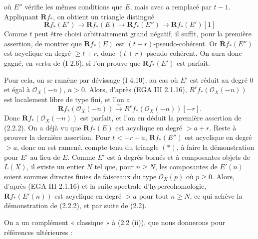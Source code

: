 où \(E''\) vérifie les
mêmes conditions que \(E\), mais avec \(a\) remplacé par \(t-1\). Appliquant \(\mathbf Rf_*\), on obtient un triangle distingué
\begin{equation}\tag{$*$}
\mathbf Rf_*(E')\longrightarrow \mathbf Rf_*(E)\longrightarrow \mathbf Rf_*(E'')\longrightarrow \mathbf Rf_*(E')[1]
\end{equation}
Comme \(t\) peut être choisi arbitrairement grand négatif, il suffit, pour la première assertion, de montrer que \(\mathbf Rf_*(E)\) est \((t+r)\)-pseudo-cohérent. Or \(\mathbf Rf_*(E'')\) est acyclique en degré \(\geq t+r\), donc \((t+r)\)-pseudo-cohérent. On aura donc gagné, en vertu de (I 2.6), si l'on prouve que \(\mathbf Rf_*(E')\) est parfait.

Pour cela, on se ramène par dévissage (I 4.10), au cas où \(E'\) est réduit au degré \(0\) et égal à \(\mathcal O_X(-n)\), \(n>0\). Alors, d'après (EGA III 2.1.16), \(R^rf_*(\mathcal O_X(-n))\) est localement libre de type fini, et l'on a
\[
  \mathbf Rf_*(\mathcal O_X(-n))\xrightarrow{\sim} R^rf_*(\mathcal O_X(-n))[-r].
\]
Donc \(\mathbf Rf_*(\mathcal O_X(-n))\) est parfait, et l'on en déduit la première assertion de (2.2.2). On a déjà vu que \(\mathbf Rf_*(E)\) est acyclique en degré \(>a+r\). Reste à prouver la dernière assertion. Pour \(t<-r+a\), \(\mathbf Rf_*(E'')\) est acyclique en degré \(>a\), donc on est ramené, compte tenu du triangle \((*)\), à faire la démonstration pour \(E'\) au lieu de \(E\). Comme \(E'\) est à degrés bornés et à composantes objets de \(L(X)\), il existe un entier \(N\) tel que, pour \(n\geq N\), les composantes de \(E'(n)\) soient sommes directes finies de faisceaux du type \(\mathcal O_X(p)\) où \(p\geq0\). Alors, d'après (EGA III 2.1.16) et la suite spectrale d'hypercohomologie, \(\mathbf Rf_*(E'(n))\) est acyclique en degré \(>a\) pour tout \(n\geq N\), ce qui achève la démonstration de (2.2.2), et par suite de (2.2).

On a un complément « classique » à (2.2 (ii)), que nous donnerons pour références ultérieures :

